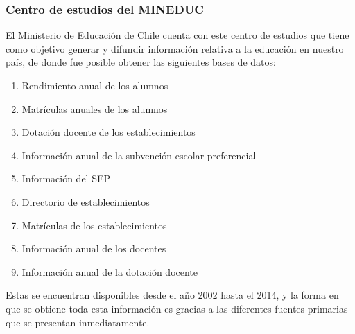 \subsubsection{Centro de estudios del MINEDUC}
El Ministerio de Educación de Chile cuenta con este centro de estudios que tiene como objetivo generar y difundir información relativa a la educación en nuestro país, de donde fue posible obtener las siguientes bases de datos:
\begin{enumerate}
\item Rendimiento anual de los alumnos
\item Matrículas anuales de los alumnos
\item Dotación docente de los establecimientos
\item Información anual de la subvención escolar preferencial
\item Información del SEP
\item Directorio de establecimientos
\item Matrículas de los establecimientos
\item Información anual de los docentes
\item Información anual de la dotación docente
\end{enumerate}

Estas se encuentran disponibles desde el año 2002 hasta el 2014, y la forma en que se obtiene toda esta información es gracias a las diferentes fuentes primarias que se presentan inmediatamente. 

